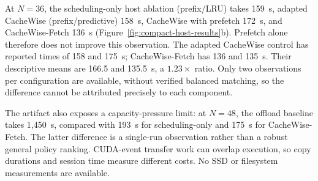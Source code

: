 At $N=36$, the scheduling-only host ablation (prefix/LRU) takes 159~s, adapted CacheWise (prefix/predictive) 158~s, CacheWise with prefetch 172~s, and CacheWise-Fetch 136~s (Figure~\ref{fig:compact-host-results}b).
Prefetch alone therefore does not improve this observation.
The adapted CacheWise control has reported times of 158 and 175~s; CacheWise-Fetch has 136 and 135~s.
Their descriptive means are 166.5 and 135.5~s, a $1.23\times$ ratio.
Only two observations per configuration are available, without verified balanced matching, so the difference cannot be attributed precisely to each component.

The artifact also exposes a capacity-pressure limit: at $N=48$, the offload baseline takes 1,450~s, compared with 193~s for scheduling-only and 175~s for CacheWise-Fetch.
The latter difference is a single-run observation rather than a robust general policy ranking.
CUDA-event transfer work can overlap execution, so copy durations and session time measure different costs.
No SSD or filesystem measurements are available.
